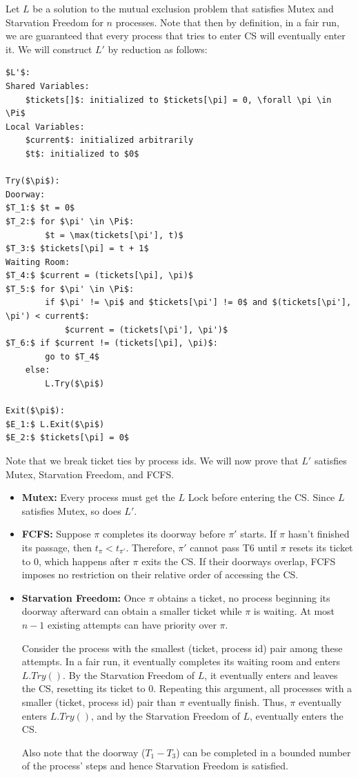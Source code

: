 \documentclass[12pt]{article}
\begin{document}
\begin{solution}
    \bbni

    Let $L$ be a solution to the mutual exclusion problem that satisfies Mutex and Starvation Freedom for $n$ processes. Note that then by definition, in a fair run, we are guaranteed that every process that tries to enter CS will eventually enter it. We will construct $L'$ by reduction as follows: 
    \begin{lstlisting}[mathescape]
$L'$: 
Shared Variables: 
    $tickets[]$: initialized to $tickets[\pi] = 0, \forall \pi \in \Pi$ 
Local Variables: 
    $current$: initialized arbitrarily
    $t$: initialized to $0$

Try($\pi$): 
Doorway: 
$T_1:$ $t = 0$
$T_2:$ for $\pi' \in \Pi$: 
        $t = \max(tickets[\pi'], t)$
$T_3:$ $tickets[\pi] = t + 1$
Waiting Room: 
$T_4:$ $current = (tickets[\pi], \pi)$
$T_5:$ for $\pi' \in \Pi$:
        if $\pi' != \pi$ and $tickets[\pi'] != 0$ and $(tickets[\pi'], \pi') < current$:
            $current = (tickets[\pi'], \pi')$
$T_6:$ if $current != (tickets[\pi], \pi)$: 
        go to $T_4$
    else: 
        L.Try($\pi$)

Exit($\pi$): 
$E_1:$ L.Exit($\pi$)
$E_2:$ $tickets[\pi] = 0$ 
    \end{lstlisting}

    Note that we break ticket ties by process ids. We will now prove that $L'$ satisfies Mutex, Starvation Freedom, and FCFS. 
    \begin{itemize}
        \item  \textbf{Mutex:} Every process must get the \(L\) Lock before entering the CS. Since \(L\) satisfies Mutex, so does \(L'\).
        \item  \textbf{FCFS:} Suppose \(\pi\) completes its doorway before \(\pi'\) starts. If \(\pi\) hasn't finished its passage, then \(t_\pi<t_{\pi'}\). Therefore, \(\pi'\) cannot pass T6 until \(\pi\) resets its ticket to 0, which happens after \(\pi\) exits the CS. If their doorways overlap, FCFS imposes no restriction on their relative order of accessing the CS. 
        \item \textbf{Starvation Freedom:} Once \(\pi\) obtains a ticket, no process beginning its doorway afterward can obtain a smaller ticket while \(\pi\) is waiting. At most \(n-1\) existing attempts can have priority over \(\pi\). 
        
        Consider the process with the smallest (ticket, process id) pair among these attempts. In a fair run, it eventually completes its waiting room and enters \(L.Try()\). By the Starvation Freedom of \(L\), it eventually enters and leaves the CS, resetting its ticket to 0. Repeating this argument, all processes with a smaller (ticket, process id) pair than $\pi$ eventually finish. Thus, \(\pi\) eventually enters \(L.Try()\), and by the Starvation Freedom of \(L\), eventually enters the CS.

        Also note that the doorway ($T_1-T_3$) can be completed in a bounded number of the process' steps and hence Starvation Freedom is satisfied.  
    \end{itemize}
    
\end{solution}
\end{document}
